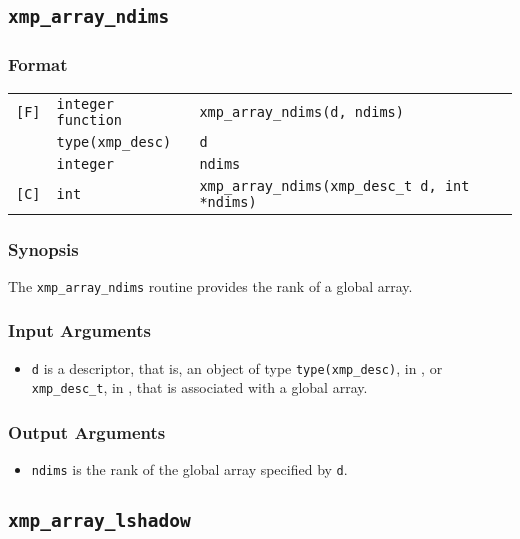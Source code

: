 \subsection{\tt xmp\_array\_ndims}

\subsubsection*{Format}

\begin{tabular}{lll}

\verb![F]!& {\tt integer function}& {\tt xmp\_array\_ndims(d, ndims)}\\
          & {\tt type(xmp\_desc)} & {\tt d}\\
          & {\tt integer} & {\tt ndims}\\

\verb![C]!&  {\tt int}& {\tt xmp\_array\_ndims(xmp\_desc\_t d, int *ndims)}\\

\end{tabular}

\subsubsection*{Synopsis}

The {\tt xmp\_array\_ndims} routine provides the rank of a global
array.


\subsubsection*{Input Arguments}
\begin{itemize}
 \item {\tt d} is a descriptor, that is, an object of type 
       {\tt type(xmp\_desc)}, in {\XMPF}, or {\tt xmp\_desc\_t},
       in {\XMPC}, that is associated with a global array.
\end{itemize}

\subsubsection*{Output Arguments}
\begin{itemize}
 \item {\tt ndims} is the rank of the global array specified by {\tt d}.
\end{itemize}


\subsection{\tt xmp\_array\_lshadow}

